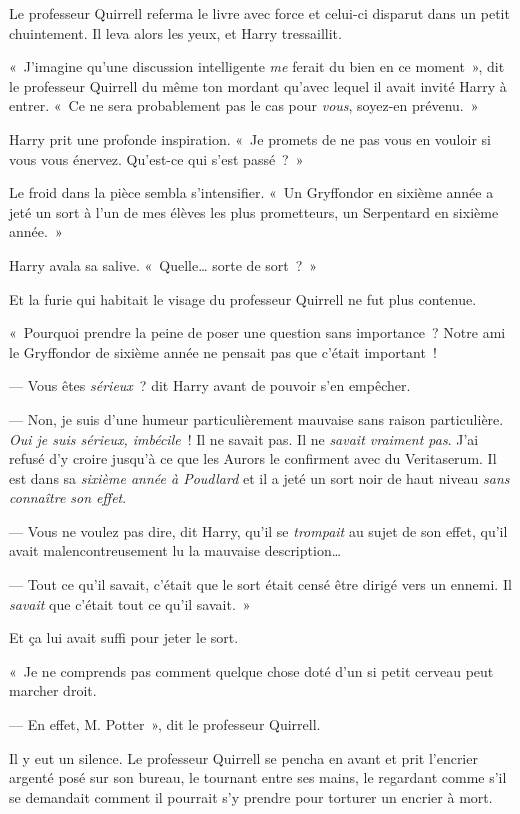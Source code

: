 Le professeur Quirrell referma le livre avec force et celui-ci disparut dans un petit chuintement. Il leva alors les yeux, et Harry tressaillit.

«~J'imagine qu'une discussion intelligente \emph{me} ferait du bien en ce moment~», dit le professeur Quirrell du même ton mordant qu'avec lequel il avait invité Harry à entrer. «~Ce ne sera probablement pas le cas pour \emph{vous}, soyez-en prévenu.~»

Harry prit une profonde inspiration. «~Je promets de ne pas vous en vouloir si vous vous énervez. Qu'est-ce qui s'est passé~?~»

Le froid dans la pièce sembla s'intensifier. «~Un Gryffondor en sixième année a jeté un sort à l'un de mes élèves les plus prometteurs, un Serpentard en sixième année.~»

Harry avala sa salive. «~Quelle… sorte de sort~?~»

Et la furie qui habitait le visage du professeur Quirrell ne fut plus contenue.

«~Pourquoi prendre la peine de poser une question sans importance~? Notre ami le Gryffondor de sixième année ne pensait pas que c'était important~!

--- Vous êtes \emph{sérieux}~? dit Harry avant de pouvoir s'en empêcher.

--- Non, je suis d'une humeur particulièrement mauvaise sans raison particulière. \emph{Oui je suis sérieux, imbécile}~! Il ne savait pas. Il ne \emph{savait vraiment pas}. J'ai refusé d'y croire jusqu'à ce que les Aurors le confirment avec du Veritaserum. Il est dans sa \emph{sixième année à Poudlard} et il a jeté un sort noir de haut niveau \emph{sans connaître son effet}.

--- Vous ne voulez pas dire, dit Harry, qu'il se \emph{trompait} au sujet de son effet, qu'il avait malencontreusement lu la mauvaise description…

--- Tout ce qu'il savait, c'était que le sort était censé être dirigé vers un ennemi. Il \emph{savait} que c'était tout ce qu'il savait.~»

Et ça lui avait suffi pour jeter le sort.

«~Je ne comprends pas comment quelque chose doté d'un si petit cerveau peut marcher droit.

--- En effet, M. Potter~», dit le professeur Quirrell.

Il y eut un silence. Le professeur Quirrell se pencha en avant et prit l'encrier argenté posé sur son bureau, le tournant entre ses mains, le regardant comme s'il se demandait comment il pourrait s'y prendre pour torturer un encrier à mort.


